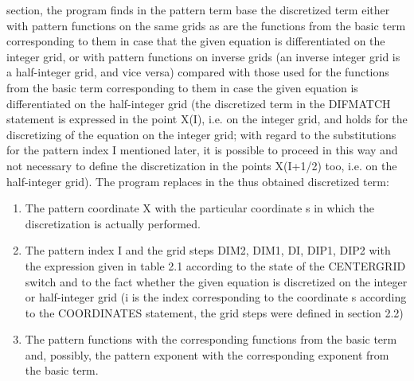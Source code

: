 section, the program finds in the pattern term base the discretized term
either with  pattern functions  on the  same grids  as are the functions
from the basic  term  corresponding  to  them  in  case  that  the given
equation  is  differentiated  on  the  integer  grid,  or  with  pattern
functions on inverse grids  (an inverse  integer grid  is a half-integer
grid, and  vice versa)  compared with  those used for the functions from
the basic term corresponding to  them  in  case  the  given  equation is
differentiated  on  the  half-integer  grid (the discretized term in the
DIFMATCH statement is expressed in the point X(I),  i.e. on  the integer
grid,  and  holds  for  the  discretizing of the equation on the integer
grid; with regard to the substitutions for the pattern index I mentioned
later, it is possible to proceed in this way and not necessary to define
the discretization in the points X(I+1/2) too, i.e.  on the half-integer
grid). The program replaces in the thus obtained discretized term:
\begin{enumerate}
  \item  The  pattern  coordinate  X  with the particular coordinate s in
  which the discretization is actually performed.

  \item The pattern index I and the grid steps DIM2, DIM1, DI, DIP1, DIP2
  with the expression given in table 2.1 according to the state of the
  CENTERGRID switch and to the  fact  whether  the  given  equation is
  discretized  on  the  integer  or  half-integer grid (i is the index
  corresponding to  the  coordinate  s  according  to  the COORDINATES
  statement, the grid steps were defined in section 2.2)

  \item The  pattern functions  with the corresponding functions from the
  basic  term  and,   possibly,   the   pattern   exponent   with  the
  corresponding exponent from the basic term.
\end{enumerate}

